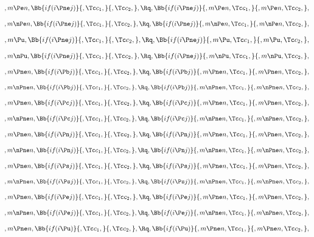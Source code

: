 \[,m \Pe n, \Bb{if(i \Pne j)}{,\Tc c_1,}{,\Tc c_2,}, \Rq , \Bb{if(i \Pne j)}{,m \Pe n,\Tc c_1,}{,m \Pe n,\Tc c_2,},\]
\bigskip
\bigskip

\[,m \nPe n, \Bb{if(i \Pne j)}{,\Tc c_1,}{,\Tc c_2,}, \Rq , \Bb{if(i \Pne j)}{,m \nPe n,\Tc c_1,}{,m \nPe n,\Tc c_2,},\]
\bigskip
\bigskip

\[,m \Pu, \Bb{if(i \Pne j)}{,\Tc c_1,}{,\Tc c_2,}, \Rq , \Bb{if(i \Pne j)}{,m \Pu,\Tc c_1,}{,m \Pu,\Tc c_2,},\]
\bigskip
\bigskip

\[,m \nPu, \Bb{if(i \Pne j)}{,\Tc c_1,}{,\Tc c_2,}, \Rq , \Bb{if(i \Pne j)}{,m \nPu,\Tc c_1,}{,m \nPu,\Tc c_2,},\]
\bigskip
\bigskip


\[,m \Pne n, \Bb{if(i \Pb j)}{,\Tc c_1,}{,\Tc c_2,}, \Rq , \Bb{if(i \Pb j)}{,m \Pne n,\Tc c_1,}{,m \Pne n,\Tc c_2,},\]
\bigskip
\bigskip

\[,m \nPne n, \Bb{if(i \Pb j)}{,\Tc c_1,}{,\Tc c_2,}, \Rq , \Bb{if(i \Pb j)}{,m \nPne n,\Tc c_1,}{,m \nPne n,\Tc c_2,},\]
\bigskip
\bigskip

\[,m \Pne n, \Bb{if(i \Pc j)}{,\Tc c_1,}{,\Tc c_2,}, \Rq , \Bb{if(i \Pc j)}{,m \Pne n,\Tc c_1,}{,m \Pne n,\Tc c_2,},\]
\bigskip
\bigskip

\[,m \nPne n, \Bb{if(i \Pc j)}{,\Tc c_1,}{,\Tc c_2,}, \Rq , \Bb{if(i \Pc j)}{,m \nPne n,\Tc c_1,}{,m \nPne n,\Tc c_2,},\]
\bigskip
\bigskip

\[,m \Pne n, \Bb{if(i \Pn j)}{,\Tc c_1,}{,\Tc c_2,}, \Rq , \Bb{if(i \Pn j)}{,m \Pne n,\Tc c_1,}{,m \Pne n,\Tc c_2,},\]
\bigskip
\bigskip

\[,m \nPne n, \Bb{if(i \Pn j)}{,\Tc c_1,}{,\Tc c_2,}, \Rq , \Bb{if(i \Pn j)}{,m \nPne n,\Tc c_1,}{,m \nPne n,\Tc c_2,},\]
\bigskip
\bigskip

\[,m \Pne n, \Bb{if(i \Ps j)}{,\Tc c_1,}{,\Tc c_2,}, \Rq , \Bb{if(i \Ps j)}{,m \Pne n,\Tc c_1,}{,m \Pne n,\Tc c_2,},\]
\bigskip
\bigskip

\[,m \nPne n, \Bb{if(i \Ps j)}{,\Tc c_1,}{,\Tc c_2,}, \Rq , \Bb{if(i \Ps j)}{,m \nPne n,\Tc c_1,}{,m \nPne n,\Tc c_2,},\]
\bigskip
\bigskip

\[,m \Pne n, \Bb{if(i \Pe j)}{,\Tc c_1,}{,\Tc c_2,}, \Rq , \Bb{if(i \Pe j)}{,m \Pne n,\Tc c_1,}{,m \Pne n,\Tc c_2,},\]
\bigskip
\bigskip

\[,m \nPne n, \Bb{if(i \Pe j)}{,\Tc c_1,}{,\Tc c_2,}, \Rq , \Bb{if(i \Pe j)}{,m \nPne n,\Tc c_1,}{,m \nPne n,\Tc c_2,},\]
\bigskip
\bigskip

\[,m \Pne n, \Bb{if(i \Pu)}{,\Tc c_1,}{,\Tc c_2,}, \Rq , \Bb{if(i \Pu)}{,m \Pne n,\Tc c_1,}{,m \Pne n,\Tc c_2,},\]
\bigskip
\bigskip

